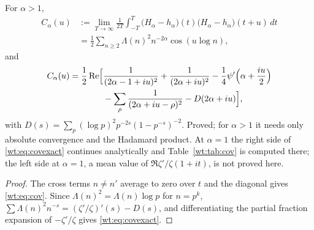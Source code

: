 \begin{theorem}\label{wt:thm:cov}
For $\alpha>1$,
\begin{equation}\label{wt:eq:cov}
\begin{split}
C_\alpha(u)&:=\lim_{T\to\infty}\frac1{2T}\int_{-T}^T\bigl(H_\alpha-h_\alpha\bigr)(t)\bigl(H_\alpha-h_\alpha\bigr)(t+u)\,dt\\
&=\frac12\sum_{n\ge2}\Lambda(n)^2n^{-2\alpha}\cos(u\log n),
\end{split}
\end{equation}
and
\begin{equation}\label{wt:eq:covexact}
\begin{split}
C_\alpha(u)=\frac12\Re\Bigl[&\frac1{(2\alpha-1+iu)^2}+\frac1{(2\alpha+iu)^2}-\frac14\psi'\Bigl(\alpha+\frac{iu}2\Bigr)\\
&-\sum_\rho\frac1{(2\alpha+iu-\rho)^2}-D(2\alpha+iu)\Bigr],
\end{split}
\end{equation}
with $D(s)=\sum_p(\log p)^2p^{-2s}(1-p^{-s})^{-2}$. Proved; for $\alpha>1$ it needs only absolute convergence and the Hadamard product. At $\alpha=1$ the right side of \eqref{wt:eq:covexact} continues analytically and Table~\ref{wt:tab:cov} is computed there; the left side at $\alpha=1$, a mean value of $\Re\zeta'/\zeta(1+it)$, is not proved here.
\end{theorem}

\begin{proof}
The cross terms $n\ne n'$ average to zero over $t$ and the diagonal gives \eqref{wt:eq:cov}. Since $\Lambda(n)^2=\Lambda(n)\log p$ for $n=p^k$, $\sum\Lambda(n)^2n^{-s}=(\zeta'/\zeta)'(s)-D(s)$, and differentiating the partial fraction expansion of $-\zeta'/\zeta$ gives \eqref{wt:eq:covexact}.
\end{proof}

